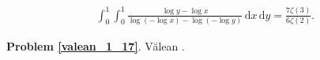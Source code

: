 %

\begin{problem_with_solution}
    \label{valean_1_17}%
    \begin{align}
        \int_0^1 \int_0^1 \frac{\log y - \log x}{\log (- \log x) - \log(- \log y)} \,\mathrm{d}x \,\mathrm{d}y = \frac{7 \zeta(3)}{6 \zeta (2)}.
    \end{align} 
\end{problem_with_solution}



\textbf{Problem \ref{valean_1_17}}.
Vălean \cite[s. 10]{nahin15}.


%